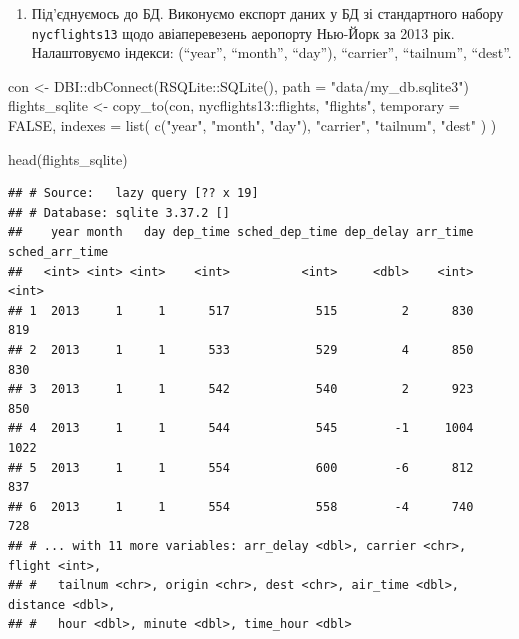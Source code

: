 \documentclass[
]{book}
\newenvironment{Shaded}{\begin{snugshade}}{\end{snugshade}}
\newcommand{\AttributeTok}[1]{\textcolor[rgb]{0.77,0.63,0.00}{#1}}
\newcommand{\ConstantTok}[1]{\textcolor[rgb]{0.00,0.00,0.00}{#1}}
\newcommand{\FunctionTok}[1]{\textcolor[rgb]{0.00,0.00,0.00}{#1}}
\newcommand{\NormalTok}[1]{#1}
\newcommand{\OtherTok}[1]{\textcolor[rgb]{0.56,0.35,0.01}{#1}}
\newcommand{\SpecialCharTok}[1]{\textcolor[rgb]{0.00,0.00,0.00}{#1}}
\newcommand{\StringTok}[1]{\textcolor[rgb]{0.31,0.60,0.02}{#1}}
\providecommand{\tightlist}{%
  \setlength{\itemsep}{0pt}\setlength{\parskip}{0pt}}
\begin{document}
\begin{enumerate}
\def\labelenumi{\arabic{enumi}.}
\setcounter{enumi}{1}
\tightlist
\item
  Під'єднуємось до БД. Виконуємо експорт даних у БД зі стандартного набору \texttt{nycflights13} щодо авіаперевезень аеропорту Нью-Йорк за 2013 рік. Налаштовуємо індекси: (``year'', ``month'', ``day''), ``carrier'', ``tailnum'', ``dest''.
\end{enumerate}

\begin{Shaded}
\begin{Highlighting}[]
\NormalTok{con }\OtherTok{\textless{}{-}}\NormalTok{ DBI}\SpecialCharTok{::}\FunctionTok{dbConnect}\NormalTok{(RSQLite}\SpecialCharTok{::}\FunctionTok{SQLite}\NormalTok{(), }\AttributeTok{path =} \StringTok{"data/my\_db.sqlite3"}\NormalTok{)}
\NormalTok{flights\_sqlite }\OtherTok{\textless{}{-}} \FunctionTok{copy\_to}\NormalTok{(con, nycflights13}\SpecialCharTok{::}\NormalTok{flights, }\StringTok{"flights"}\NormalTok{,}
        \AttributeTok{temporary =} \ConstantTok{FALSE}\NormalTok{, }
        \AttributeTok{indexes =} \FunctionTok{list}\NormalTok{(}
          \FunctionTok{c}\NormalTok{(}\StringTok{"year"}\NormalTok{, }\StringTok{"month"}\NormalTok{, }\StringTok{"day"}\NormalTok{), }
          \StringTok{"carrier"}\NormalTok{, }
          \StringTok{"tailnum"}\NormalTok{,}
          \StringTok{"dest"}
\NormalTok{        )}
\NormalTok{)}

\FunctionTok{head}\NormalTok{(flights\_sqlite)}
\end{Highlighting}
\end{Shaded}

\begin{verbatim}
## # Source:   lazy query [?? x 19]
## # Database: sqlite 3.37.2 []
##    year month   day dep_time sched_dep_time dep_delay arr_time sched_arr_time
##   <int> <int> <int>    <int>          <int>     <dbl>    <int>          <int>
## 1  2013     1     1      517            515         2      830            819
## 2  2013     1     1      533            529         4      850            830
## 3  2013     1     1      542            540         2      923            850
## 4  2013     1     1      544            545        -1     1004           1022
## 5  2013     1     1      554            600        -6      812            837
## 6  2013     1     1      554            558        -4      740            728
## # ... with 11 more variables: arr_delay <dbl>, carrier <chr>, flight <int>,
## #   tailnum <chr>, origin <chr>, dest <chr>, air_time <dbl>, distance <dbl>,
## #   hour <dbl>, minute <dbl>, time_hour <dbl>
\end{verbatim}
\end{document}
